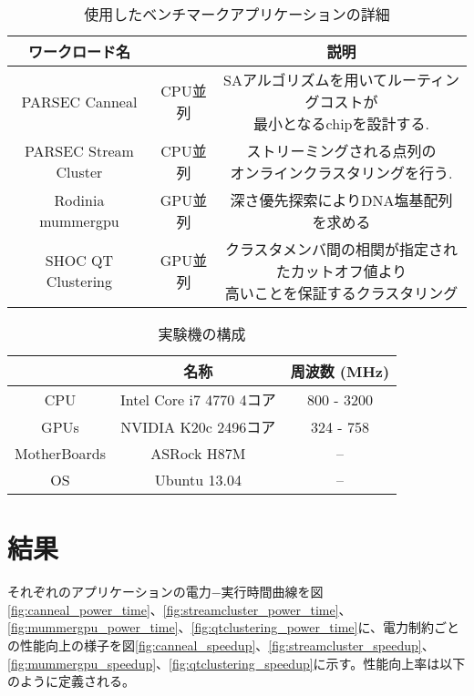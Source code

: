 \begin{table}[t]
\begin{center}\begin{tabular}{|c|c|c|}
\hline ワークロード名 & & 説明 \\
\hline PARSEC Canneal & CPU並列 & \shortstack{SAアルゴリズムを用いてルーティングコストが\\最小となるchipを設計する. }\\
\hline PARSEC Stream Cluster & CPU並列 & \shortstack{ストリーミングされる点列の\\オンラインクラスタリングを行う. }\\
\hline Rodinia mummergpu & GPU並列 & 深さ優先探索によりDNA塩基配列を求める\\
\hline SHOC QT Clustering & GPU並列 & \shortstack{クラスタメンバ間の相関が指定されたカットオフ値より\\高いことを保証するクラスタリング}\\
\hline \end{tabular} \caption{使用したベンチマークアプリケーションの詳細}\label{tbl:parsec}
\end{center}
\end{table}

\begin{table}[h]
    \centering
    \begin{tabular}{|c|c|c|}
        \hline
                     & 名称  &  周波数 (MHz) \\ \hline
        CPU          & Intel Core i7 4770 4コア & 800 - 3200   \\ \hline
        GPUs         & NVIDIA K20c 2496コア         & 324 - 758  \\ \hline
        MotherBoards & ASRock H87M & -- \\ \hline
        OS           & Ubuntu 13.04 &  -- \\ \hline
    \end{tabular}
    \caption{実験機の構成}
    \label{tab:machine-setup}
\end{table}



\section{結果}
\label{sec:result}

それぞれのアプリケーションの電力−実行時間曲線を図\ref{fig:canneal_power_time}、\ref{fig:streamcluster_power_time}、\ref{fig:mummergpu_power_time}、\ref{fig:qtclustering_power_time}に、電力制約ごとの性能向上の様子を図\ref{fig:canneal_speedup}、\ref{fig:streamcluster_speedup}、\ref{fig:mummergpu_speedup}、\ref{fig:qtclustering_speedup}に示す。性能向上率は以下のように定義される。

